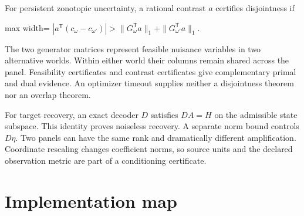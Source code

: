 \documentclass[
  11pt,
  a4paper,
]{report}
\begin{document}
For persistent zonotopic uncertainty, a rational contrast \(a\)
certifies disjointness if

\begin{center}
\begin{adjustbox}{max width=\linewidth}
$\displaystyle
\left|a^\mathsf T(c_\omega-c_{\omega'})\right|
>
\|G_\omega^\mathsf Ta\|_1+
\|G_{\omega'}^\mathsf Ta\|_1.
$
\end{adjustbox}
\end{center}

The two generator matrices represent feasible nuisance variables in two
alternative worlds. Within either world their columns remain shared
across the panel. Feasibility certificates and contrast certificates
give complementary primal and dual evidence. An optimizer timeout
supplies neither a disjointness theorem nor an overlap theorem.

For target recovery, an exact decoder \(D\) satisfies \(DA=H\) on the
admissible state subspace. This identity proves noiseless recovery. A
separate norm bound controls \(D\eta\). Two panels can have the same
rank and dramatically different amplification. Coordinate rescaling
changes coefficient norms, so source units and the declared observation
metric are part of a conditioning certificate.

\hypertarget{implementation-map}{%
\section{Implementation map}\label{implementation-map}}
\end{document}
